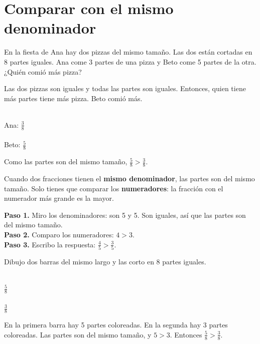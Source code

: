 
\section{Comparar con el mismo denominador}

En la fiesta de Ana hay dos pizzas del mismo tamaño. Las dos están cortadas en 8 partes iguales. Ana come 3 partes de una pizza y Beto come 5 partes de la otra. ¿Quién comió más pizza?

Las dos pizzas son iguales y todas las partes son iguales. Entonces, quien tiene más partes tiene más pizza. Beto comió más.

\begin{center}
\\[1mm]
Ana: $\frac{3}{8}$\\[4mm]
\\[1mm]
Beto: $\frac{5}{8}$
\end{center}

Como las partes son del mismo tamaño, $\frac{5}{8} > \frac{3}{8}$.

\begin{wbidea}
Cuando dos fracciones tienen el \textbf{mismo denominador}, las partes son del mismo tamaño. Solo tienes que comparar los \textbf{numeradores}: la fracción con el numerador más grande es la mayor.
\end{wbidea}

\begin{wbexample}
\textbf{Paso 1.} Miro los denominadores: son 5 y 5. Son iguales, así que las partes son del mismo tamaño.\\[1mm]
\textbf{Paso 2.} Comparo los numeradores: $4 > 3$.\\[1mm]
\textbf{Paso 3.} Escribo la respuesta: $\frac{4}{5} > \frac{3}{5}$.
\end{wbexample}

\begin{wbexample}
Dibujo dos barras del mismo largo y las corto en 8 partes iguales.

\begin{center}
\\[1mm]
$\frac{5}{8}$\\[3mm]
\\[1mm]
$\frac{3}{8}$
\end{center}

En la primera barra hay 5 partes coloreadas. En la segunda hay 3 partes coloreadas. Las partes son del mismo tamaño, y $5 > 3$. Entonces $\frac{5}{8} > \frac{3}{8}$.
\end{wbexample}

